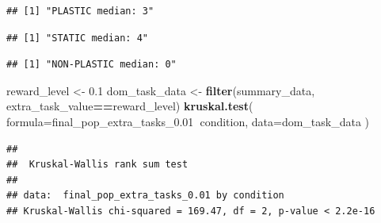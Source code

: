 \documentclass[]{book}
\newenvironment{Shaded}{\begin{snugshade}}{\end{snugshade}}
\newcommand{\DataTypeTok}[1]{\textcolor[rgb]{0.13,0.29,0.53}{#1}}
\newcommand{\FloatTok}[1]{\textcolor[rgb]{0.00,0.00,0.81}{#1}}
\newcommand{\KeywordTok}[1]{\textcolor[rgb]{0.13,0.29,0.53}{\textbf{#1}}}
\newcommand{\NormalTok}[1]{#1}
\newcommand{\OperatorTok}[1]{\textcolor[rgb]{0.81,0.36,0.00}{\textbf{#1}}}
\newcommand{\StringTok}[1]{\textcolor[rgb]{0.31,0.60,0.02}{#1}}
\begin{document}
\begin{verbatim}
## [1] "PLASTIC median: 3"
\end{verbatim}

\begin{Shaded}
\end{Shaded}

\begin{verbatim}
## [1] "STATIC median: 4"
\end{verbatim}

\begin{Shaded}
\end{Shaded}

\begin{verbatim}
## [1] "NON-PLASTIC median: 0"
\end{verbatim}

\begin{Shaded}
\begin{Highlighting}[]
\NormalTok{reward_level <-}\StringTok{ }\FloatTok{0.1}
\NormalTok{dom_task_data <-}\StringTok{ }\KeywordTok{filter}\NormalTok{(summary_data, extra_task_value}\OperatorTok{==}\NormalTok{reward_level)}
\KeywordTok{kruskal.test}\NormalTok{(}
  \DataTypeTok{formula=}\NormalTok{final_pop_extra_tasks_}\FloatTok{0.01}\OperatorTok{~}\NormalTok{condition,}
  \DataTypeTok{data=}\NormalTok{dom_task_data}
\NormalTok{)}
\end{Highlighting}
\end{Shaded}

\begin{verbatim}
## 
##  Kruskal-Wallis rank sum test
## 
## data:  final_pop_extra_tasks_0.01 by condition
## Kruskal-Wallis chi-squared = 169.47, df = 2, p-value < 2.2e-16
\end{verbatim}
\end{document}
